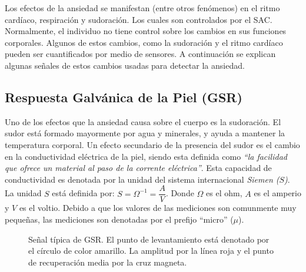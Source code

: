Los efectos de la ansiedad se manifestan (entre otros fen\'omenos) en el ritmo card\'iaco, respiraci\'on y sudoraci\'on. Los cuales son controlados por el SAC. Normalmente, el individuo no tiene control sobre los cambios en sus funciones corporales. Algunos de estos cambios, como la sudoraci\'on y el ritmo card\'iaco pueden ser cuantificados por medio de sensores. A continuaci\'on se explican algunas se\~nales de estos cambios usadas para detectar la ansiedad.

	\subsection{Respuesta Galv\'anica de la Piel (GSR)}\label{secc:gsr}
	Uno de los efectos que la ansiedad causa sobre el cuerpo es la sudoraci\'on. El sudor est\'a formado mayormente por agua y minerales, y ayuda a mantener la temperatura corporal. Un efecto secundario de la presencia del sudor es el cambio en la conductividad el\'ectrica de la piel, siendo esta definida como \textit{``la facilidad que ofrece un material al paso de la corrente el\'ectrica''}. Esta capacidad de conductividad es denotada por la unidad del sistema internacional \textit{Siemen ($S$)}. La unidad $S$ est\'a definida por: $S = \Omega^{-1} = \dfrac{A}{V}$. Donde $\Omega$ es el ohm, $A$ es el amperio y $V$ es el voltio. Debido a que los valores de las mediciones son comunmente muy peque\~nas, las mediciones son denotadas por el prefijo ``micro'' ($\mu$).
	\begin{figure}[h]
		\centering
		\caption{Se\~nal t\'ipica de GSR. El punto de levantamiento est\'a denotado por el c\'irculo de color amarillo. La amplitud por la l\'inea roja y el punto de recuperaci\'on media por la cruz magneta. \label{fig:GSRsignal}}
	\end{figure}

